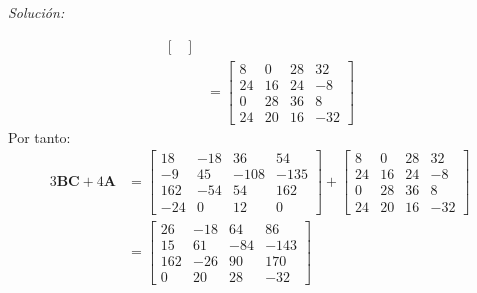 \documentclass[12pt]{article}
\newenvironment{sol}
    {\emph{Solución:}
    }
    {
    }
\begin{document}
\begin{sol}
\begin{align*}
\begin{bmatrix}
	\end{bmatrix} \\
	&= \begin{bmatrix}
		8 & 0 & 28 & 32 \\
		24 & 16 & 24 & -8 \\
		0 & 28 & 36 & 8 \\
		24 & 20 & 16 & -32
	\end{bmatrix}
\end{align*}
Por tanto:
\begin{align*}
3\textbf{BC}+4\textbf{A} &=
\begin{bmatrix}
18 & -18 & 36 & 54 \\
-9 & 45 & -108 & -135 \\
162 & -54 & 54 & 162 \\
-24 & 0 & 12 & 0
\end{bmatrix}
+
\begin{bmatrix}
8 & 0 & 28 & 32 \\
24 & 16 & 24 & -8 \\
0 & 28 & 36 & 8 \\
24 & 20 & 16 & -32
\end{bmatrix} \\
&= \begin{bmatrix}
26 & -18 & 64 & 86 \\
15 & 61 & -84 & -143 \\
162 & -26 & 90 & 170 \\
0 & 20 & 28 & -32
\end{bmatrix}
\end{align*}


\end{sol}
\end{document}
